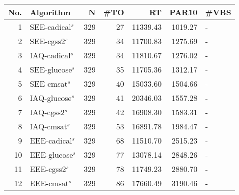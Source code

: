 \begin{tabular}{rlrrrrl}
\toprule
No. & Algorithm & N & #TO & RT & PAR10 & #VBS \\
\midrule
1 & SEE-cadical$^s$ & 329 & 27 & 11339.43 & 1019.27 & - \\
2 & SEE-cgss2$^s$ & 329 & 34 & 11700.83 & 1275.69 & - \\
3 & IAQ-cadical$^s$ & 329 & 34 & 11810.67 & 1276.02 & - \\
4 & SEE-glucose$^s$ & 329 & 35 & 11705.36 & 1312.17 & - \\
5 & SEE-cmsat$^s$ & 329 & 40 & 15033.60 & 1504.66 & - \\
6 & IAQ-glucose$^s$ & 329 & 41 & 20346.03 & 1557.28 & - \\
7 & IAQ-cgss2$^s$ & 329 & 42 & 16908.30 & 1583.31 & - \\
8 & IAQ-cmsat$^s$ & 329 & 53 & 16891.78 & 1984.47 & - \\
9 & EEE-cadical$^s$ & 329 & 68 & 11510.70 & 2515.23 & - \\
10 & EEE-glucose$^s$ & 329 & 77 & 13078.14 & 2848.26 & - \\
11 & EEE-cgss2$^s$ & 329 & 78 & 11749.23 & 2880.70 & - \\
12 & EEE-cmsat$^s$ & 329 & 86 & 17660.49 & 3190.46 & - \\
\bottomrule
\end{tabular}
